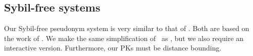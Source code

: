 \subsection{Sybil-free systems}%
\label{sybil-free-systems}

Our Sybil-free pseudonym system is very similar to that of 
\textcite{SybilFreePseudonyms}.
Both are based on the work of \textcite{HowToWinTheCloneWars}.
We make the same simplification of~\cite{HowToWinTheCloneWars} as 
\textcite{SybilFreePseudonyms}, but we also require an interactive version.
Furthermore, our \acp{PK} must be distance bounding.

